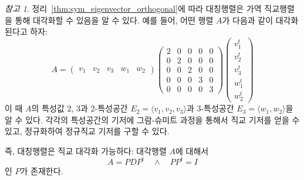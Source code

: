 \documentclass[unfonts,oneside,a4paper]{oblivoir}
\theoremstyle{definition}
\theoremstyle{theorem}
\newtheorem{theorem}{정리}[section]
\theoremstyle{theorem}
\theoremstyle{remark}
\newtheorem*{remark}{참고}
\theoremstyle{remark}
\theoremstyle{remark}
\theoremstyle{remark}
\renewcommand{\vec}[1]{\bm{\mathit{#1}}}
\begin{document}
\begin{remark}
    정리~\ref{thm:sym_eigenvector_orthogonal}에 따라 대칭행렬은 가역 직교행렬을 통해 대각화할 수 있음을 알 수 있다.
    예를 들어, 어떤 행렬 $A$가 다음과 같이 대각화된다고 하자:
    \begin{equation*}
        A =
        \begin{pmatrix}
            \vec v_1 & \vec v_2 & \vec v_3 & \vec w_1 & \vec w_2
        \end{pmatrix}
        \begin{pmatrix}
            2 & 0 & 0 & 0 & 0\\
            0 & 2 & 0 & 0 & 0\\
            0 & 0 & 2 & 0 & 0\\
            0 & 0 & 0 & 3 & 0\\
            0 & 0 & 0 & 0 & 3
        \end{pmatrix}
        \begin{pmatrix}
            \vec v_1^t \\ \vec v_2^t \\ \vec v_3^t \\ \vec w_1^t \\ \vec w_2^t
        \end{pmatrix}
    \end{equation*}
    이 때 $A$의 특성값 2, 3과 2-특성공간 $E_2 = \langle \vec v_1, \vec v_2, \vec v_3 \rangle$과 3-특성공간 $E_3 = \langle \vec w_1, \vec w_2\rangle$을 알 수 있다.
    각각의 특성공간의 기저에 그람-슈미트 과정을 통해서 직교 기저를 얻을 수 있고, 정규화하여 정규직교 기저를 구할 수 있다.
    
    즉, 대칭행렬은 직교 대각화 가능하다:
    대각행렬 $A$에 대해서
    \begin{equation*}
        A = PDP^t \quad \wedge \quad PP^t = I
    \end{equation*}
    인 $P$가 존재한다.
\end{remark}

\end{document}
